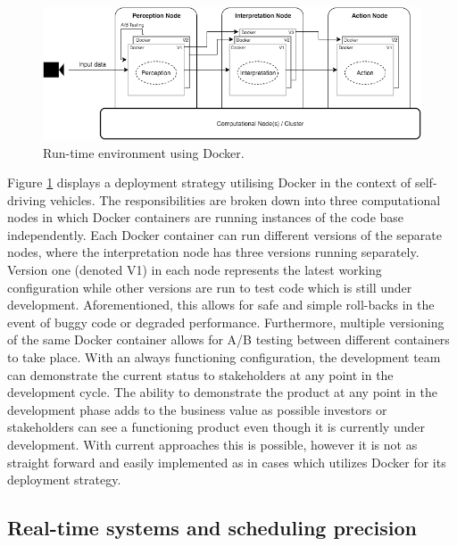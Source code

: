 \begin{figure}[ht]
\centering
     \includegraphics[width=1.0\textwidth]{./figure/containers.png}
      \caption{Run-time environment using Docker.}
       \label{containers}
\end{figure}


Figure \ref{containers} displays a deployment strategy utilising Docker in the context of self-driving vehicles. The responsibilities are broken down into three computational nodes in which Docker containers are running instances of the code base independently. Each Docker container can run different versions of the separate nodes, where the interpretation node has three versions running separately. Version one (denoted V1) in each node represents the latest working configuration while other versions are run to test code which is still under development. Aforementioned, this allows for safe and simple roll-backs in the event of buggy code or degraded performance. Furthermore, multiple versioning of the same Docker container allows for A/B testing between different containers to take place. With an always functioning configuration, the development team can demonstrate the current status to stakeholders at any point in the development cycle. The ability to demonstrate the product at any point in the development phase adds to the business value as possible investors or stakeholders can see a functioning product even though it is currently under development. With current approaches this is possible, however it is not as straight forward and easily implemented as in cases which utilizes Docker for its deployment strategy.\\


\subsection{Real-time systems and scheduling precision}


